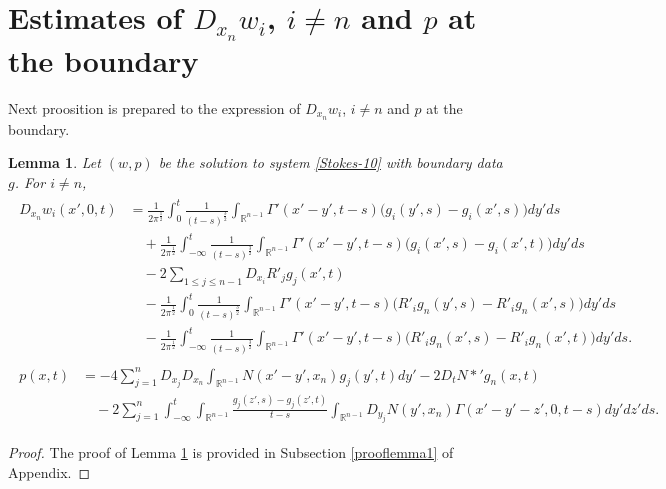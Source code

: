 \documentclass{amsart}
\newtheorem{lemma}[defn]{Lemma}
\numberwithin{equation}{section}
\newcommand{\Rn}{{\mathbb R}^{n-1}}
\newcommand{\Ga}{\Gamma}
\begin{document}
 



\section{Estimates of  $  D_{x_n} w_i $,  $ i \neq n  $  and $p$ at the boundary}\label{SS-derivative}
\setcounter{equation}{0}

Next proosition is prepared to the expression of $  D_{x_n} w_i $,  $ i \neq n  $  and $p$ at the boundary.

 \begin{lemma}\label{thoe1021-1} 
Let $(w,p)$ be the  solution to system \eqref{Stokes-10} with boundary data $g$.   For $i \neq n$,   
 \begin{align}\label{normal}
\begin{split}
D_{x_n }w_i (x',0,t) &  = \frac{1}{2 \pi^ \frac12}\int_0^t  \frac1{(t -s)^\frac32}    \int_{\Rn}   \Ga' (x' -y', t-s) \big(  g_i(y',s)   -   g_i(x',s)    \big)  dy' ds\\
&\quad +\frac{1}{ 2\pi^ \frac12}  \int_{-\infty}^t     \frac1{(t -s)^\frac32}   \int_{\Rn}  \Ga' (x' -y', t-s) 
\big(  g_i(x',s)   -  g_i(x',t)    \big)    dy' ds\\
&\quad   -2  \sum_{1 \leq j \leq n-1}  D_{x_i}R'_j  g_j (x',t) \\
& \quad -\frac1{2\pi^\frac12}\int_0^t  \frac1{(t -s)^\frac32}    \int_{\Rn}   \Ga' (x' -y', t-s) \big( R'_i g_n(y',s)   - R'_i g_n(x',s)    \big)  dy' ds\\
&\quad -  \frac1{2\pi^\frac12} \int_{-\infty}^t     \frac1{(t -s)^\frac32}   \int_{\Rn}  \Ga' (x' -y', t-s) 
\big( R'_i g_n(x',s)   - R'_i g_n(x',t)    \big)    dy' ds.
\end{split}
\end{align}
\begin{align}\label{representationpressure-1}
\begin{split}
p(x,t) 
& = -4 \sum_{j =1}^{n} D_{x_j} D_{x_n} \int_{\Rn} N(x' -y', x_n) g_j(y', t) dy' - 2 D_t N*' g_n (x,t) \\
& \quad - 2\sum_{j =1}^{n} \int_{-\infty}^t \int_{\Rn}\frac{g_j (z',s) -g_j(z',t)}{t -s} 
  \int_{\Rn} D_{y_j} N(y', x_n) \Ga(x'-y' -z',0,t-s) dy' dz' ds. 
\end{split}
\end{align}
\end{lemma}
 \begin{proof}
The proof of Lemma \ref{thoe1021-1} is provided   in  Subsection \ref{prooflemma1} of Appendix.
 \end{proof}
 
\end{document}
